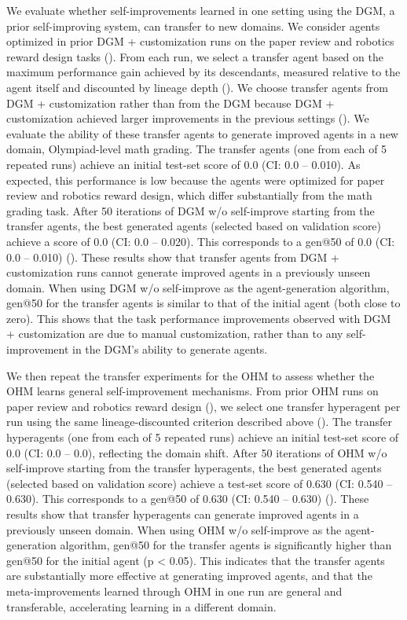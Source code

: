 \documentclass[]{fairmeta}
\begin{document}
We evaluate whether self-improvements learned in one setting using the DGM, a prior self-improving system, can transfer to new domains. We consider agents optimized in prior DGM + customization runs on the paper review and robotics reward design tasks (). From each run, we select a transfer agent based on the maximum performance gain achieved by its descendants, measured relative to the agent itself and discounted by lineage depth (). We choose transfer agents from DGM + customization rather than from the DGM because DGM + customization achieved larger improvements in the previous settings (). We evaluate the ability of these transfer agents to generate improved agents in a new domain, Olympiad-level math grading. The transfer agents (one from each of 5 repeated runs) achieve an initial test-set score of 0.0 (CI: 0.0 -- 0.010). As expected, this performance is low because the agents were optimized for paper review and robotics reward design, which differ substantially from the math grading task. After 50 iterations of DGM w/o self-improve starting from the transfer agents, the best generated agents (selected based on validation score) achieve a score of 0.0 (CI: 0.0 -- 0.020). This corresponds to a gen@50 of 0.0 (CI: 0.0 -- 0.010) (). These results show that transfer agents from DGM + customization runs cannot generate improved agents in a previously unseen domain. When using DGM w/o self-improve as the agent-generation algorithm, gen@50 for the transfer agents is similar to that of the initial agent (both close to zero). This shows that the task performance improvements observed with DGM + customization are due to manual customization, rather than to any self-improvement in the DGM's ability to generate agents.

We then repeat the transfer experiments for the OHM to assess whether the OHM learns general self-improvement mechanisms. From prior OHM runs on paper review and robotics reward design (), we select one transfer hyperagent per run using the same lineage-discounted criterion described above (). The transfer hyperagents (one from each of 5 repeated runs) achieve an initial test-set score of 0.0 (CI: 0.0 -- 0.0), reflecting the domain shift. After 50 iterations of OHM w/o self-improve starting from the transfer hyperagents, the best generated agents (selected based on validation score) achieve a test-set score of 0.630 (CI: 0.540 -- 0.630). This corresponds to a gen@50 of 0.630 (CI: 0.540 -- 0.630) (). These results show that transfer hyperagents can generate improved agents in a previously unseen domain. When using OHM w/o self-improve as the agent-generation algorithm, gen@50 for the transfer agents is significantly higher than gen@50 for the initial agent (p < 0.05). This indicates that the transfer agents are substantially more effective at generating improved agents, and that the meta-improvements learned through OHM in one run are general and transferable, accelerating learning in a different domain.
\end{document}
